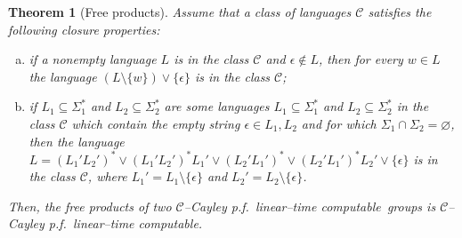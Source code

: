 \documentclass[article,12pt]{elsarticle}
\newtheorem{theorem}{Theorem}
\newcommand\ClinearC{$\mathcal{C}$--Cayley p.f.~linear--time computable}
\begin{document}
\begin{theorem}[Free products]
	\label{freeproducttheorem}	
	Assume that a class of languages $\mathcal{C}$ 
	satisfies the following closure properties: 
	\begin{enumerate}[(a)]
		\item{if a nonempty language $L$ is in the class 
			$\mathcal{C}$ and $\epsilon \notin L$, 
			then for every $w \in L$ the language 
			$\left(L \setminus \{w\} \right) 
			\vee \{\epsilon\} $} is in the class 
		$\mathcal{C}$; 
		\item{if $L_1 \subseteq \Sigma_1 ^*$ 
			and $L_2 \subseteq \Sigma_2 ^*$ 
			are some languages $L_1 \subseteq \Sigma_1 ^*$ 
			and $L_2 \subseteq \Sigma_2 ^*$ in the class 
			$\mathcal{C}$ which contain the empty string 
			$\epsilon \in  L_1, L_2$ and
			for which $\Sigma_1 \cap  \Sigma_2 = \varnothing$, 
			then the language 
			$L= (L_1' L_2')^* \vee
			(L_1' L_2')^* L_1' \vee 
			(L_2' L_1')^* \vee         
			(L_2' L_1')^* L_2' 
			\vee \{\epsilon\}$ 
			is in the class $\mathcal{C}$, where 
			$L_1 ' = L_1 \setminus \{\epsilon\}$
			and $L_2 ' = L_2 \setminus \{\epsilon\}$.}      
	\end{enumerate}
	Then, the free products of two 
	\ClinearC\ groups is \ClinearC. 
\end{theorem}
\end{document}
